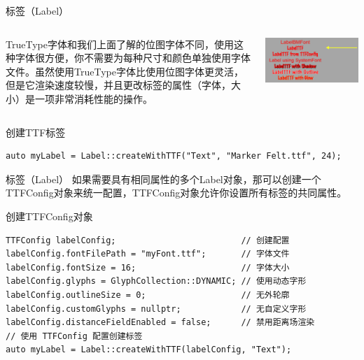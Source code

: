 \documentclass{beamer}
\begin{document}
\begin{frame}[fragile]{标签（Label）}
\begin{columns}
\begin{column}{0.4\textwidth}
TrueType字体和我们上面了解的位图字体不同，使用这种字体很方便，你不需要为每种尺寸和颜色单独使用字体文件。虽然使用TrueType字体比使用位图字体更灵活，但是它渲染速度较慢，并且更改标签的属性（字体，大小）是一项非常消耗性能的操作。
\end{column}
\begin{column}{0.6\textwidth}
\includegraphics[width=\textwidth]
{figures/label_2}
\end{column}
\end{columns}
\begin{block}{创建TTF标签}
\begin{verbatim}
auto myLabel = Label::createWithTTF("Text", "Marker Felt.ttf", 24);
\end{verbatim}
\end{block}
\end{frame}


\begin{frame}[fragile]{标签（Label）}
如果需要具有相同属性的多个Label对象，那可以创建一个TTFConfig对象来统一配置，TTFConfig对象允许你设置所有标签的共同属性。
\begin{block}{创建TTFConfig对象}
\begin{verbatim}
TTFConfig labelConfig;                         // 创建配置
labelConfig.fontFilePath = "myFont.ttf";       // 字体文件
labelConfig.fontSize = 16;                     // 字体大小
labelConfig.glyphs = GlyphCollection::DYNAMIC; // 使用动态字形
labelConfig.outlineSize = 0;                   // 无外轮廓
labelConfig.customGlyphs = nullptr;            // 无自定义字形
labelConfig.distanceFieldEnabled = false;      // 禁用距离场渲染
// 使用 TTFConfig 配置创建标签
auto myLabel = Label::createWithTTF(labelConfig, "Text");
\end{verbatim}
\end{block}
\end{frame}
\end{document}
